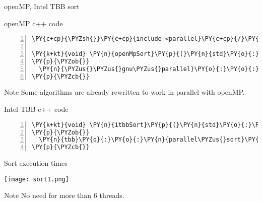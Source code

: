 \documentclass{beamer}
\begin{document}
\begin{frame}[fragile]{openMP, Intel TBB sort}

\begin{block}{openMP c++ code}

\tiny
\begin{Verbatim}[commandchars=\\\{\},numbers=left,firstnumber=1,stepnumber=1]
\PY{c+cp}{\PYZsh{}}\PY{c+cp}{include <parallel}\PY{c+cp}{/}\PY{c+cp}{algorithm>}

\PY{k+kt}{void} \PY{n}{openMpSort}\PY{p}{(}\PY{n}{std}\PY{o}{:}\PY{o}{:}\PY{n}{vector}\PY{o}{<}\PY{k+kt}{float}\PY{o}{>}\PY{o}{&} \PY{n}{data}\PY{p}{)}
\PY{p}{\PYZob{}}
  \PY{n}{\PYZus{}\PYZus{}gnu\PYZus{}parallel}\PY{o}{:}\PY{o}{:}\PY{n}{sort}\PY{p}{(}\PY{n}{data}\PY{p}{.}\PY{n}{begin}\PY{p}{(}\PY{p}{)}\PY{p}{,} \PY{n}{data}\PY{p}{.}\PY{n}{end}\PY{p}{(}\PY{p}{)}\PY{p}{)}\PY{p}{;}
\PY{p}{\PYZcb{}}
\end{Verbatim}

\end{block}

\begin{exampleblock}{Note}
\small
Some algorithms are already rewritten to work in parallel with openMP.
\end{exampleblock}

\begin{block}{Intel TBB c++ code}

\tiny
\begin{Verbatim}[commandchars=\\\{\},numbers=left,firstnumber=1,stepnumber=1]
\PY{k+kt}{void} \PY{n}{itbbSort}\PY{p}{(}\PY{n}{std}\PY{o}{:}\PY{o}{:}\PY{n}{vector}\PY{o}{<}\PY{k+kt}{float}\PY{o}{>}\PY{o}{&} \PY{n}{data}\PY{p}{)}
\PY{p}{\PYZob{}}
  \PY{n}{tbb}\PY{o}{:}\PY{o}{:}\PY{n}{parallel\PYZus{}sort}\PY{p}{(}\PY{n}{data}\PY{p}{.}\PY{n}{begin}\PY{p}{(}\PY{p}{)}\PY{p}{,} \PY{n}{data}\PY{p}{.}\PY{n}{end}\PY{p}{(}\PY{p}{)}\PY{p}{)}\PY{p}{;}
\PY{p}{\PYZcb{}}
\end{Verbatim}

\end{block}

\end{frame}


\begin{frame}[fragile]{Sort execution times}

\begin{center}
\texttt{[image: sort1.png]} 
\end{center}

\begin{exampleblock}{Note}
\small
No need for more than 6 threads.
\end{exampleblock}

\end{frame}
\end{document}
